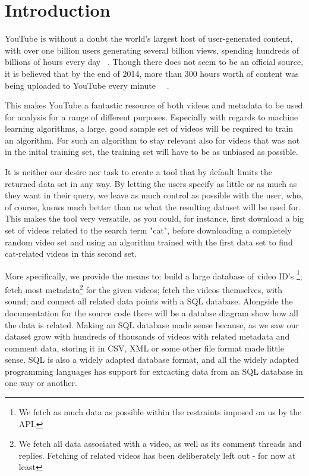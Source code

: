 
\section{Introduction}

YouTube is without a doubt the world's largest host of user-generated content,
with over one billion users generating several billion views, spending hundreds
of billions of hours every day ~\cite{officialstats}. Though there does not seem
to be an official source, it is believed that by the end of 2014, more than 300
hours worth of content was being uploaded to YouTube every minute 
~\cite{dagensmediastats}~\cite{reelseostats}. 

This makes YouTube a fantastic resource of both videos and metadata to be used
for analysis for a range of different purposes. Especially with regards to
machine learning algorithms, a large, good sample set of videos will be required
to train an algorithm. For such an algorithm to stay relevant also for videos
that was not in the inital training set, the training set will have to be as
unbiased as possible.

It is neither our desire nor task to create a tool that by default limits the
returned data set in any way. By letting the users specify as little or as much
as they want in their query, we leave as much control as possible with the user,
who, of course, knows much better than us what the resulting dataset will be
used for. This makes the tool very versatile, as you could, for instance, first
download a big set of videos related to the search term "cat", before
downloading a completely random video set and using an algorithm trained with
the first data set to find cat-related videos in this second set. 

More specifically, we provide the means to: build a large database of video ID's
\footnote{We fetch as much data as possible within the restraints imposed
on us by the API.}; fetch most metadata\footnote{We fetch all data associated
with a video, as well as its comment threads and replies. Fetching of related
videos has been deliberately left out - for now at least} for the given videos;
fetch the videos themselves, with sound; and connect all related data points
with a SQL database. Alongside the documentation for the source code there will
be a databse diagram show how all the data is related. Making an SQL database
made sense because, as we saw our dataset grow with hundreds of thousands of
videos with related metadata and comment data, storing it in CSV, XML or some
other file format made little sense. SQL is also a widely adapted database
format, and all the widely adapted programming languages has support for
extracting data from an SQL database in one way or another.

